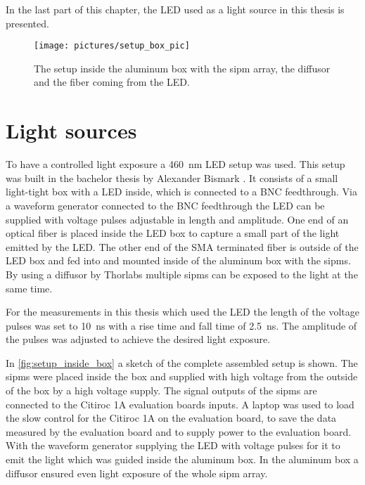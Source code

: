 In the last part of this chapter, the LED used as a light source in this thesis is presented.

\begin{figure}
	\centering
	\texttt{[image: pictures/setup\_box\_pic]}
	\caption[Setup inside the aluminum Box]{The setup inside the aluminum box with the \ac{sipm} array, the diffusor and the fiber coming from the LED.}
	\label{fig:setup_inside_box}
\end{figure}



\section{Light sources}
To have a controlled light exposure a \SI{460}{\nano\meter} LED setup was used.
This setup was built in the bachelor thesis by Alexander Bismark \cite{alex_bismark}.
It consists of a small light-tight box with a LED inside, which is connected to a BNC feedthrough.
Via a waveform generator connected to the BNC feedthrough the LED can be supplied with voltage pulses adjustable in length and amplitude. 
One end of an optical fiber is placed inside the LED box to capture a small part of the light emitted by the LED.
The other end of the SMA terminated fiber is outside of the LED box and fed into and mounted inside of the aluminum box with the \ac{sipm}s.
By using a diffusor by Thorlabs \cite{thorlabs_diffusor} multiple \ac{sipm}s can be exposed to the light at the same time. 

For the measurements in this thesis which used the LED the length of the voltage pulses was set to \SI{10}{\nano\second} with a rise time and fall time of \SI{2.5}{\nano\second}.
The amplitude of the pulses was adjusted to achieve the desired light exposure.

\mbox{}

\mbox{}

In \autoref{fig:setup_inside_box} a sketch of the complete assembled setup is shown.
The \acp{sipm} were placed inside the box and supplied with high voltage from the outside of the box by a high voltage supply.
The signal outputs of the \acp{sipm} are connected to the Citiroc 1A evaluation boards inputs.
A laptop was used to load the slow control for the Citiroc 1A on the evaluation board, to save the data measured by the evaluation board and to supply power to the evaluation board.
With the waveform generator supplying the LED with voltage pulses for it to emit the light which was guided inside the aluminum box.
In the aluminum box a diffusor ensured even light exposure of the whole \ac{sipm} array.

